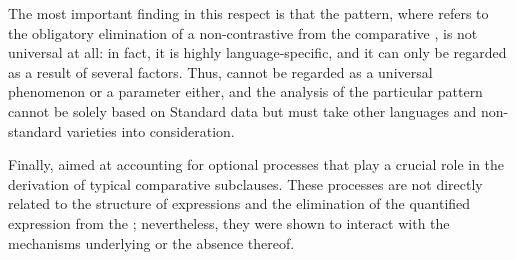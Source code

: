 \ea \upshape \label{summary7}
\z

The most important finding in this respect is that the  pattern, where  refers to the obligatory elimination of a non-contrastive  from the comparative , is not universal at all: in fact, it is highly language-specific, and it can only be regarded as a result of several factors. Thus,  cannot be regarded as a universal phenomenon or a parameter either, and the analysis of the particular  pattern cannot be solely based on Standard  data but must take other languages and non-standard varieties into consideration.

Finally,  aimed at accounting for optional  processes that play a crucial role in the derivation of typical comparative subclauses. These processes are not directly related to the structure of  expressions and the elimination of the quantified expression from the ; nevertheless, they were shown to interact with the mechanisms underlying  or the absence thereof.


